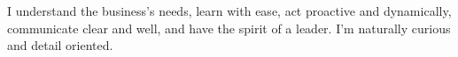 


\small
I understand the business's needs, learn with ease, act proactive and dynamically, 
communicate clear and well, and have the spirit of a leader. I'm naturally curious
and detail oriented.
